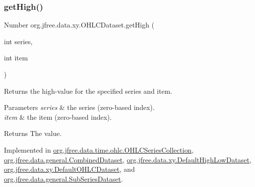 \mbox{\label{interfaceorg_1_1jfree_1_1data_1_1xy_1_1_o_h_l_c_dataset_a03f647b09b1a04ae0c2eb2bc5116d4d4}} 
\subsubsection{\texorpdfstring{get\+High()}{getHigh()}}
{\footnotesize\ttfamily Number org.\+jfree.\+data.\+xy.\+O\+H\+L\+C\+Dataset.\+get\+High (\begin{DoxyParamCaption}\item[{int}]{series,  }\item[{int}]{item }\end{DoxyParamCaption})}

Returns the high-\/value for the specified series and item.


\begin{DoxyParams}{Parameters}
{\em series} & the series (zero-\/based index). \\
\hline
{\em item} & the item (zero-\/based index).\\
\hline
\end{DoxyParams}
\begin{DoxyReturn}{Returns}
The value. 
\end{DoxyReturn}


Implemented in \mbox{\hyperlink{classorg_1_1jfree_1_1data_1_1time_1_1ohlc_1_1_o_h_l_c_series_collection_a8ff1342849ccce17620f04158a99792b}{org.\+jfree.\+data.\+time.\+ohlc.\+O\+H\+L\+C\+Series\+Collection}}, \mbox{\hyperlink{classorg_1_1jfree_1_1data_1_1general_1_1_combined_dataset_a6709a0b24bb619f18f80d1f70b7d7019}{org.\+jfree.\+data.\+general.\+Combined\+Dataset}}, \mbox{\hyperlink{classorg_1_1jfree_1_1data_1_1xy_1_1_default_high_low_dataset_a3a49c92b4564fa5d6c9628b4395feaef}{org.\+jfree.\+data.\+xy.\+Default\+High\+Low\+Dataset}}, \mbox{\hyperlink{classorg_1_1jfree_1_1data_1_1xy_1_1_default_o_h_l_c_dataset_a23bff0b7d14e36f42fe82fd177f050d6}{org.\+jfree.\+data.\+xy.\+Default\+O\+H\+L\+C\+Dataset}}, and \mbox{\hyperlink{classorg_1_1jfree_1_1data_1_1general_1_1_sub_series_dataset_a2aa5a696278793154f451fddbb698e1e}{org.\+jfree.\+data.\+general.\+Sub\+Series\+Dataset}}.

